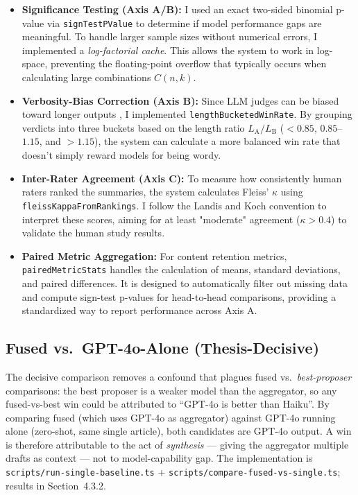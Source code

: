 \begin{itemize}
  \item \textbf{Significance Testing (Axis A/B):} I used an exact two-sided 
        binomial p-value via \texttt{signTestPValue} to determine if 
        model performance gaps are meaningful. To handle larger sample sizes 
        without numerical errors, I implemented a \textit{log-factorial cache}. 
        This allows the system to work in log-space, preventing the 
        floating-point overflow that typically occurs when calculating 
        large combinations $C(n, k)$.
  \item \textbf{Verbosity-Bias Correction (Axis B):} Since LLM judges can be 
        biased toward longer outputs \cite{Dubois2024}, I implemented 
        \texttt{length}\allowbreak\texttt{Bucketed}\allowbreak\texttt{WinRate}. 
        By grouping verdicts into three buckets based on the length ratio 
        $L_{\text{A}}/L_{\text{B}}$ ($<0.85$, $0.85$--$1.15$, and $>1.15$), 
        the system can calculate a more balanced win rate that doesn't 
        simply reward models for being wordy.
  \item \textbf{Inter-Rater Agreement (Axis C):} To measure how consistently 
        human raters ranked the summaries, the system calculates Fleiss' $\kappa$ 
        using \texttt{fleiss}\allowbreak\texttt{Kappa}\allowbreak\texttt{From}\allowbreak\texttt{Rankings}. 
        I follow the Landis and Koch \cite{Landis1977} convention to interpret these 
        scores, aiming for at least "moderate" agreement ($\kappa > 0.4$) to 
        validate the human study results.
  \item \textbf{Paired Metric Aggregation:} For content retention metrics, 
        \texttt{paired}\allowbreak\texttt{Metric}\allowbreak\texttt{Stats} handles 
        the calculation of means, standard deviations, and paired differences. 
        It is designed to automatically filter out missing data and compute 
        sign-test p-values for head-to-head comparisons, providing a 
        standardized way to report performance across Axis A.
\end{itemize}

\subsection{Fused vs.\ GPT-4o-Alone (Thesis-Decisive)}

The decisive comparison removes a confound that plagues fused
vs.\ \textit{best-proposer} comparisons: the best proposer is a
weaker model than the aggregator, so any fused-vs-best win could be
attributed to ``GPT-4o is better than Haiku''. By comparing
fused (which uses GPT-4o as aggregator) against GPT-4o running alone
(zero-shot, same single article), both candidates are GPT-4o output.
A win is therefore attributable to the act of
\textit{synthesis} --- giving the aggregator multiple drafts as
context --- not to model-capability gap. The implementation is
\texttt{scripts/run-single-baseline.ts} +
\texttt{scripts/compare-fused-vs-single.ts}; results in Section~4.3.2.

